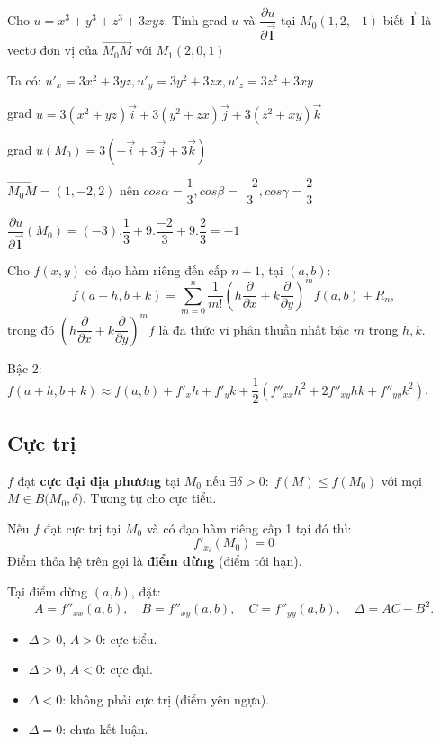 \documentclass[12pt,a4paper]{article}
\begin{document}
\begin{vidu}
    Cho $u = x^3 + y^3 + z^3 + 3xyz$. Tính grad $u$ và $\dfrac{\partial u}{\partial \vec{\mathbf{l}}}$ tại $M_0(1, 2, -1)$ biết $\vec{\mathbf{l}}$ là vectơ đơn vị của $\vec {M_0M}$ với $M_1(2, 0 ,1)$

    Ta có: $u'_x = 3x^2 + 3yz, u'_y = 3y^2 + 3zx, u'_z = 3z^2 + 3xy$

    grad $u = 3(x^2 + yz)\vec{i} + 3(y^2 + zx)\vec{j} + 3(z^2 + xy)\vec{k}$

    grad $u(M_0) = 3(-\vec{i} + 3\vec{j} +3\vec{k})$

    $\vec{M_0M} = (1, -2, 2)$ nên $cos \alpha = \dfrac{1}{3}, cos \beta = \dfrac{-2}{3}, cos \gamma = \dfrac{2}{3}$

    $\dfrac{\partial u}{\partial \vec{\mathbf{l}}}(M_0) = (-3).\dfrac{1}{3} + 9.\dfrac{-2}{3} + 9.\dfrac{2}{3} = -1$
\end{vidu}

\begin{congthuc}[title={Công thức Taylor nhiều biến}]
  Cho $f(x,y)$ có đạo hàm riêng đến cấp $n+1$, tại $(a,b)$:
  \[
    f(a+h, b+k) = \sum_{m=0}^{n} \dfrac{1}{m!}\left(h\dfrac{\partial}{\partial x} + k\dfrac{\partial}{\partial y}\right)^m f(a,b) + R_n,
  \]
  trong đó $\left(h\dfrac{\partial}{\partial x} + k\dfrac{\partial}{\partial y}\right)^m f$ là đa thức vi phân thuần nhất bậc $m$ trong $h, k$.

  Bậc 2: $f(a+h, b+k) \approx f(a,b) + f'_x h + f'_y k + \dfrac{1}{2}(f''_{xx}h^2 + 2f''_{xy}hk + f''_{yy}k^2)$.
\end{congthuc}

\subsection{Cực trị}

\begin{dinhnghia}
  $f$ đạt \textbf{cực đại địa phương} tại $M_0$ nếu $\exists \delta > 0:\; f(M) \le f(M_0)$ với mọi $M \in B\bigl(M_0, \delta\bigr)$. Tương tự cho cực tiểu.
\end{dinhnghia}

\begin{dinhly}[title={Điều kiện cần}]
  Nếu $f$ đạt cực trị tại $M_0$ và có đạo hàm riêng cấp 1 tại đó thì:
  \[
    f'_{x_i}(M_0) = 0
  \]
  Điểm thỏa hệ trên gọi là \textbf{điểm dừng} (điểm tới hạn).
\end{dinhly}

\begin{dinhly}[title={Điều kiện đủ cực trị (hai biến)}]
  Tại điểm dừng $(a,b)$, đặt:
  \[
    A = f''_{xx}(a,b),\quad B = f''_{xy}(a,b),\quad C = f''_{yy}(a,b),\quad \Delta = AC - B^2.
  \]
  \begin{itemize}
    \item $\Delta > 0$, $A > 0$: cực tiểu.
    \item $\Delta > 0$, $A < 0$: cực đại.
    \item $\Delta < 0$: không phải cực trị (điểm yên ngựa).
    \item $\Delta = 0$: chưa kết luận.
  \end{itemize}
\end{dinhly}
\end{document}
